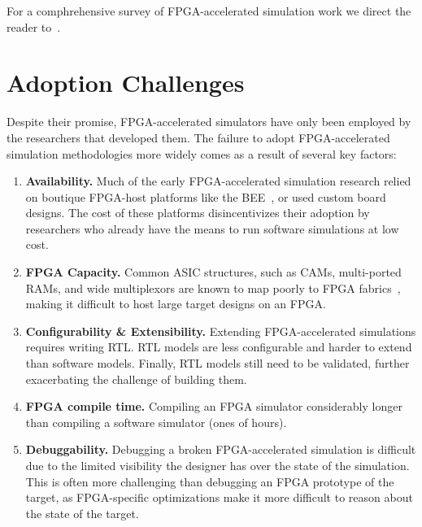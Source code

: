 For a comphrehensive survey of FPGA-accelerated simulation work we direct
the reader to~\cite{fpgasimbook}.

\section{Adoption Challenges}

Despite their promise, FPGA-accelerated simulators have only been employed by
the researchers that developed them. The failure to adopt FPGA-accelerated
simulation methodologies more widely comes as a result of several key factors:

\begin{enumerate}

    \item \textbf{Availability.} Much of the early FPGA-accelerated simulation research
        relied on boutique FPGA-host platforms like the BEE~\cite{bee2}, or
        used custom board designs. The cost of these platforms disincentivizes
        their adoption by researchers who already have the means to run
        software simulations at low cost.

    \item \textbf{FPGA Capacity.} Common ASIC structures, such as CAMs,
        multi-ported RAMs, and wide multiplexors are known to map poorly to
        FPGA fabrics~\cite{fpgagap, fpgagap2}, making it difficult to host
        large target designs on an FPGA.

    \item \textbf{Configurability \& Extensibility.} Extending FPGA-accelerated
        simulations requires writing RTL. RTL models are less configurable and
        harder to extend than software models. Finally, RTL models still need
        to be validated, further exacerbating the challenge of building them.

    \item \textbf{FPGA compile time.} Compiling an FPGA simulator considerably
        longer than compiling a software simulator (ones of hours).

    \item \textbf{Debuggability.} Debugging a broken FPGA-accelerated
        simulation is difficult due to the limited visibility the designer has
        over the state of the simulation. This is often more challenging than
        debugging an FPGA prototype of the target, as FPGA-specific
        optimizations make it more difficult to reason about the state of the
        target.

\end{enumerate}

